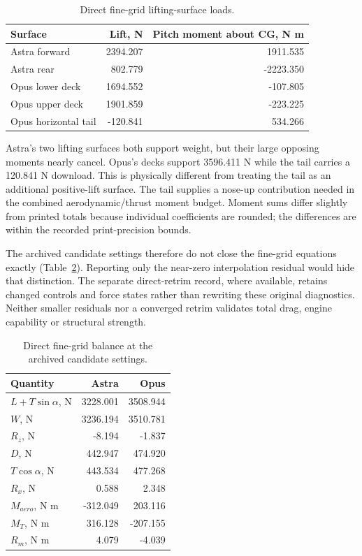 \documentclass[10pt,letterpaper]{article}
\begin{document}
\begin{table}[H]\centering\small
\caption{Direct fine-grid lifting-surface loads.}\label{tab:loads}
\begin{tabular}{lrr}\toprule
Surface & Lift, N & Pitch moment about CG, N m\\\midrule
Astra forward &2394.207&1911.535\\
Astra rear &802.779&-2223.350\\
Opus lower deck &1694.552&-107.805\\
Opus upper deck &1901.859&-223.225\\
Opus horizontal tail &-120.841&534.266\\\bottomrule
\end{tabular}
\end{table}



Astra's two lifting surfaces both support weight, but their large opposing moments nearly cancel. Opus's decks support 3596.411 N while the tail carries a 120.841 N download. This is physically different from treating the tail as an additional positive-lift surface. The tail supplies a nose-up contribution needed in the combined aerodynamic/thrust moment budget. Moment sums differ slightly from printed totals because individual coefficients are rounded; the differences are within the recorded print-precision bounds.



The archived candidate settings therefore do not close the fine-grid equations exactly (Table~\ref{tab:residual}). Reporting only the near-zero interpolation residual would hide that distinction. The separate direct-retrim record, where available, retains changed controls and force states rather than rewriting these original diagnostics. Neither smaller residuals nor a converged retrim validates total drag, engine capability or structural strength.

\begin{table}[H]\centering\small
\caption{Direct fine-grid balance at the archived candidate settings.}\label{tab:residual}
\begin{tabular}{lrr}\toprule
Quantity & Astra & Opus\\\midrule
$L+T\sin\alpha$, N &3228.001&3508.944\\
$W$, N &3236.194&3510.781\\
$R_z$, N &-8.194&-1.837\\
$D$, N &442.947&474.920\\
$T\cos\alpha$, N &443.534&477.268\\
$R_x$, N &0.588&2.348\\
$M_{aero}$, N m &-312.049&203.116\\
$M_T$, N m &316.128&-207.155\\
$R_m$, N m &4.079&-4.039\\\bottomrule
\end{tabular}
\end{table}
\end{document}
